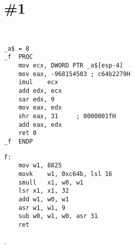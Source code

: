 ﻿\section{\Exercise \#1}
\label{exercise_arith_optimizations_1}

\WhatThisCodeDoes\

\begin{lstlisting}[caption=\Optimizing MSVC 2010]
_a$ = 8
_f	PROC
	mov	ecx, DWORD PTR _a$[esp-4]
	mov	eax, -968154503	; c64b2279H
	imul	ecx
	add	edx, ecx
	sar	edx, 9
	mov	eax, edx
	shr	eax, 31		; 0000001fH
	add	eax, edx
	ret	0
_f	ENDP
\end{lstlisting}

\begin{lstlisting}[caption=\Optimizing GCC 4.9 (ARM64)]
f:
	mov	w1, 8825
	movk	w1, 0xc64b, lsl 16
	smull	x1, w0, w1
	lsr	x1, x1, 32
	add	w1, w0, w1
	asr	w1, w1, 9
	sub	w0, w1, w0, asr 31
	ret
\end{lstlisting}

\Answer\: .
